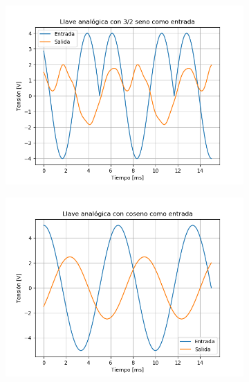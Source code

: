\begin{figure}[H]
	\begin{subfigure}{.5\textwidth}
	\centering
	\includegraphics[width=\textwidth]{ImagenesEjercicio6/puntoa/LA - 3 2.png}
	\end{subfigure}	
	\begin{subfigure}{.5\textwidth}
	\centering
	\includegraphics[width=\textwidth]{ImagenesEjercicio6/puntoa/LA - Cos.png}
	\end{subfigure}
	

\end{figure}
